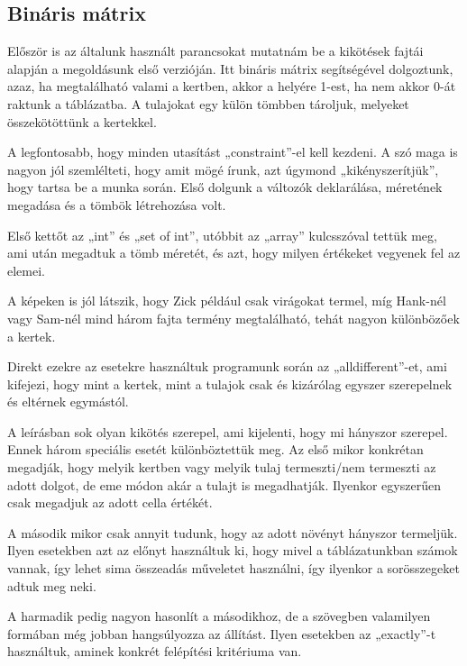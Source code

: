 \documentclass[12pt,a4paper,twoside, openright]{report}
\begin{document}
\subsection{Bináris mátrix}

    Először is az általunk használt parancsokat mutatnám be a kikötések fajtái alapján a megoldásunk első verzióján.
    Itt bináris mátrix segítségével dolgoztunk, azaz, ha megtalálható valami a kertben, akkor a helyére 1-est, ha nem akkor 0-át raktunk a táblázatba.
    A tulajokat egy külön tömbben tároljuk, melyeket összekötöttünk a kertekkel.


    A legfontosabb, hogy minden utasítást „constraint”-el kell kezdeni.
    A szó maga is nagyon jól szemlélteti, hogy amit mögé írunk, azt úgymond „kikényszerítjük”, hogy tartsa be a munka során.
    Első dolgunk a változók deklarálása, méretének megadása és a tömbök létrehozása volt.

    Első kettőt az „int” és „set of int”, utóbbit az „array” kulcsszóval tettük meg, ami után megadtuk a tömb méretét, és azt, hogy milyen értékeket vegyenek fel az elemei.


    A képeken is jól látszik, hogy Zick például csak virágokat termel, míg Hank-nél vagy 
    Sam-nél mind három fajta termény megtalálható, tehát nagyon különbözőek a kertek.

    Direkt ezekre az esetekre használtuk programunk során az „alldifferent”-et, ami kifejezi, hogy mint a kertek, mint a tulajok csak és kizárólag egyszer szerepelnek és eltérnek egymástól.


    A leírásban sok olyan kikötés szerepel, ami kijelenti, hogy mi hányszor szerepel.
    Ennek három speciális esetét különböztettük meg.
    Az első mikor konkrétan megadják, hogy melyik kertben vagy melyik tulaj termeszti/nem termeszti az adott dolgot, de eme módon akár a tulajt is megadhatják.
    Ilyenkor egyszerűen csak megadjuk az adott cella értékét.


    A második mikor csak annyit tudunk, hogy az adott növényt hányszor termeljük.
    Ilyen esetekben azt az előnyt használtuk ki, hogy mivel a táblázatunkban számok vannak, így lehet sima összeadás műveletet használni, így ilyenkor a sorösszegeket adtuk meg neki.


    A harmadik pedig nagyon hasonlít a másodikhoz, de a szövegben valamilyen formában még jobban hangsúlyozza az állítást.
    Ilyen esetekben az „exactly”-t használtuk, aminek konkrét felépítési kritériuma van.
\end{document}
